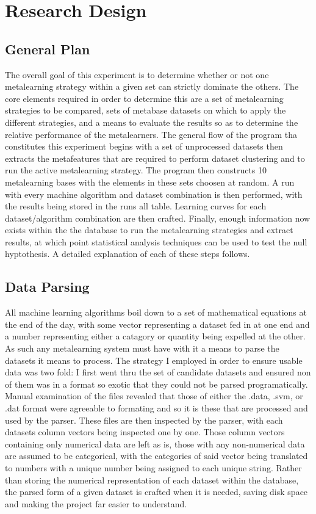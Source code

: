 \chapter{Research Design}
\label{Chapter3}
\section{General Plan}
The overall goal of this experiment is to determine whether or not one
metalearning strategy within a given set can strictly dominate the others. The
core elements required in order to determine this are a set of metalearning
strategies to be compared, sets of metabase datasets on which to apply the
different strategies, and a means to evaluate the results so as to determine the
relative performance of the metalearners. The general flow of the program tha
constitutes this experiment begins with a set of unprocessed datasets then
extracts the metafeatures that are required to perform dataset clustering and to
run the active metalearning strategy. The program then constructs 10
metalearning bases with the elements in these sets choosen at random. A run with
every machine algorithm and dataset combination is then performed, with the
results being stored in the runs all table. Learning curves for each
dataset/algorithm combination are then crafted. Finally, enough information now
exists within the the database to run the metalearning strategies
and extract results, at which point statistical analysis techniques can be used
to test the null hyptothesis. A detailed explanation of each of these steps
follows.

\section{Data Parsing}
All machine learning algorithms boil down to a set of mathematical equations at
the end of the day, with some vector representing a dataset fed in at one end
and a number representing either a catagory or quantity being expelled at the
other. As such any metalearning system must have with it a means to parse the
datasets it means to process. The strategy I employed in order to ensure usable
data was two fold: I first went thru the set of candidate datasets and ensured
non of them was in a format so exotic that they could not be parsed
programatically. Manual examination of the files revealed that those of either
the .data, .svm, or .dat format were agreeable to formating and so it is these
that are processed and used by the parser. These files are then inspected by the
parser, with each datasets column vectors being inspected one by one. Those
column vectors containing only numerical data are left as is, those with any
non-numerical data are assumed to be categorical, with the categories of said
vector being translated to numbers with a unique number being assigned to each
unique string. Rather than storing the numerical representation of each dataset
within the database, the parsed form of a given dataset is crafted when it is
needed, saving disk space and making the project far easier to understand.


